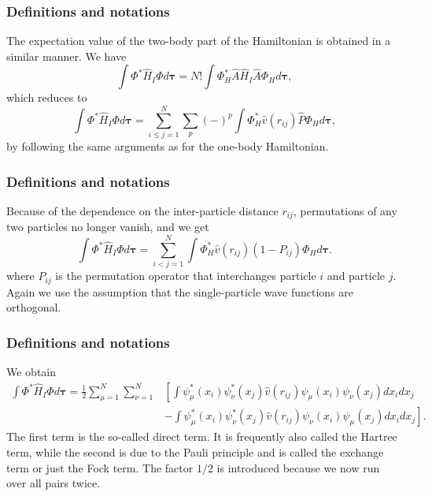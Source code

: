 \documentclass{beamer}
\begin{document}
\begin{frame}
\frametitle{Definitions and notations}

\begin{block}{}
The expectation value of the two-body part of the Hamiltonian is obtained in a
similar manner. We have
\[
  \int \Phi^*\hat{H}_I\Phi d\mathbf{\tau} 
  = N! \int \Phi_H^*\hat{A}\hat{H}_I\hat{A}\Phi_H d\mathbf{\tau},
\]
which reduces to
\[
 \int \Phi^*\hat{H}_I\Phi d\mathbf{\tau} 
  = \sum_{i\le j=1}^N \sum_{p} (-)^p\int 
  \Phi_H^*\hat{v}(r_{ij})\hat{P}\Phi_H d\mathbf{\tau},
\]
by following the same arguments as for the one-body
Hamiltonian. 
\end{block}
\end{frame}

\begin{frame}
\frametitle{Definitions and notations}

\begin{block}{}
Because of the dependence on the inter-particle distance $r_{ij}$,  permutations of
any two particles no longer vanish, and we get
\[
  \int \Phi^*\hat{H}_I\Phi d\mathbf{\tau} 
  = \sum_{i < j=1}^N \int  
  \Phi_H^*\hat{v}(r_{ij})(1-P_{ij})\Phi_H d\mathbf{\tau}.
\]
where $P_{ij}$ is the permutation operator that interchanges
particle $i$ and particle $j$. Again we use the assumption that the single-particle wave functions
are orthogonal. 
\end{block}
\end{frame}

\begin{frame}
\frametitle{Definitions and notations}

\begin{block}{}
We obtain
\begin{equation}
\begin{split}
  \int \Phi^*\hat{H}_I\Phi d\mathbf{\tau} 
  = \frac{1}{2}\sum_{\mu=1}^N\sum_{\nu=1}^N
    &\left[ \int \psi_{\mu}^*(x_i)\psi_{\nu}^*(x_j)\hat{v}(r_{ij})\psi_{\mu}(x_i)\psi_{\nu}(x_j)
    dx_idx_j \right.\\
  &\left.
  - \int \psi_{\mu}^*(x_i)\psi_{\nu}^*(x_j)
  \hat{v}(r_{ij})\psi_{\nu}(x_i)\psi_{\mu}(x_j)
  dx_idx_j
  \right]. \label{H2Expectation}
\end{split}
\end{equation}
The first term is the so-called direct term. It is frequently also called the  Hartree term, 
while the second is due to the Pauli principle and is called
the exchange term or just the Fock term.
The factor  $1/2$ is introduced because we now run over
all pairs twice. 
\end{block}
\end{frame}
\end{document}
